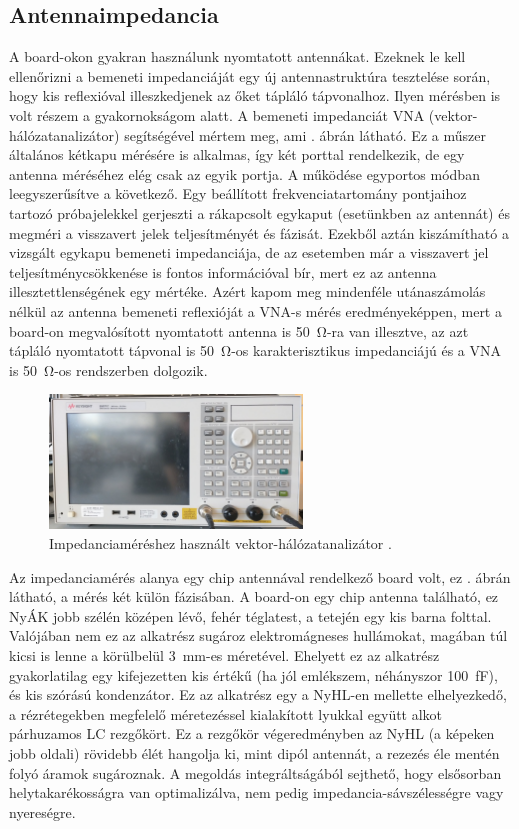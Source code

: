         \subsection{Antennaimpedancia}
            A board-okon gyakran használunk nyomtatott antennákat. Ezeknek le kell ellenőrizni a bemeneti impedanciáját egy új antennastruktúra tesztelése során, hogy kis reflexióval illeszkedjenek az őket tápláló tápvonalhoz. Ilyen mérésben is volt részem a gyakornokságom alatt. A bemeneti impedanciát VNA (vektor-hálózatanalizátor) segítségével mértem meg, ami . ábrán látható. Ez a műszer általános kétkapu mérésére is alkalmas, így két porttal rendelkezik, de egy antenna méréséhez elég csak az egyik portja. A működése egyportos módban leegyszerűsítve a következő. Egy beállított frekvenciatartomány pontjaihoz tartozó próbajelekkel gerjeszti a rákapcsolt egykaput (esetünkben az antennát) és megméri a visszavert jelek teljesítményét és fázisát. Ezekből aztán kiszámítható a vizsgált egykapu bemeneti impedanciája, de az esetemben már a visszavert jel teljesítménycsökkenése is fontos információval bír, mert ez az antenna illesztettlenségének egy mértéke. Azért kapom meg mindenféle utánaszámolás nélkül az antenna bemeneti reflexióját a VNA-s mérés eredményeképpen, mert a board-on megvalósított nyomtatott antenna is \qty{50}{\ohm}-ra van illesztve, az azt tápláló nyomtatott tápvonal is \qty{50}{\ohm}-os karakterisztikus impedanciájú és a VNA is \qty{50}{\ohm}-os rendszerben dolgozik.
           \begin{figure}
                \centering
                \includegraphics[width=0.6\textwidth]{kep/szerkesztett/vna.jpg}
                \caption{Impedanciaméréshez használt vektor-hálózatanalizátor \cite{Keysight}.}
                \label{fig:vna}
            \end{figure}
            \par
            Az impedanciamérés alanya egy chip antennával rendelkező board volt, ez . ábrán látható, a mérés két külön fázisában. A board-on egy chip antenna található, ez NyÁK jobb szélén középen lévő, fehér téglatest, a tetején egy kis barna folttal. Valójában nem ez az alkatrész sugároz elektromágneses hullámokat, magában túl kicsi is lenne a körülbelül \qty{3}{mm}-es méretével. Ehelyett ez az alkatrész gyakorlatilag egy kifejezetten kis értékű (ha jól emlékszem, néhányszor \qty{100}{fF}), és kis szórású kondenzátor. Ez az alkatrész egy a NyHL-en mellette elhelyezkedő, a rézrétegekben megfelelő méretezéssel kialakított lyukkal együtt alkot párhuzamos LC rezgőkört. Ez a rezgőkör végeredményben az NyHL (a képeken jobb oldali) rövidebb élét hangolja ki, mint dipól antennát, a rezezés éle mentén folyó áramok sugároznak. A megoldás integráltságából sejthető, hogy elsősorban helytakarékosságra van optimalizálva, nem pedig impedancia-sávszélességre vagy nyereségre.
